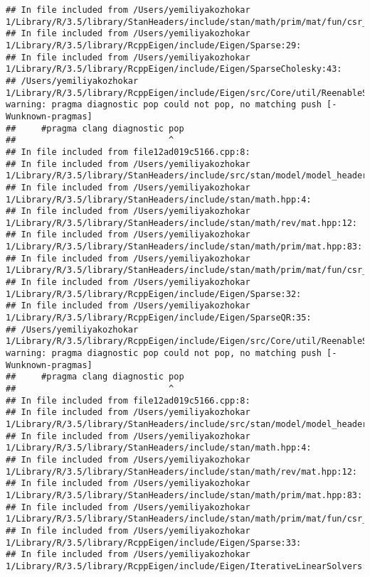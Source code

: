 \documentclass[]{article}
\begin{document}
\begin{verbatim}
## In file included from /Users/yemiliyakozhokar 1/Library/R/3.5/library/StanHeaders/include/stan/math/prim/mat/fun/csr_extract_u.hpp:6:
## In file included from /Users/yemiliyakozhokar 1/Library/R/3.5/library/RcppEigen/include/Eigen/Sparse:29:
## In file included from /Users/yemiliyakozhokar 1/Library/R/3.5/library/RcppEigen/include/Eigen/SparseCholesky:43:
## /Users/yemiliyakozhokar 1/Library/R/3.5/library/RcppEigen/include/Eigen/src/Core/util/ReenableStupidWarnings.h:10:30: warning: pragma diagnostic pop could not pop, no matching push [-Wunknown-pragmas]
##     #pragma clang diagnostic pop
##                              ^
## In file included from file12ad019c5166.cpp:8:
## In file included from /Users/yemiliyakozhokar 1/Library/R/3.5/library/StanHeaders/include/src/stan/model/model_header.hpp:4:
## In file included from /Users/yemiliyakozhokar 1/Library/R/3.5/library/StanHeaders/include/stan/math.hpp:4:
## In file included from /Users/yemiliyakozhokar 1/Library/R/3.5/library/StanHeaders/include/stan/math/rev/mat.hpp:12:
## In file included from /Users/yemiliyakozhokar 1/Library/R/3.5/library/StanHeaders/include/stan/math/prim/mat.hpp:83:
## In file included from /Users/yemiliyakozhokar 1/Library/R/3.5/library/StanHeaders/include/stan/math/prim/mat/fun/csr_extract_u.hpp:6:
## In file included from /Users/yemiliyakozhokar 1/Library/R/3.5/library/RcppEigen/include/Eigen/Sparse:32:
## In file included from /Users/yemiliyakozhokar 1/Library/R/3.5/library/RcppEigen/include/Eigen/SparseQR:35:
## /Users/yemiliyakozhokar 1/Library/R/3.5/library/RcppEigen/include/Eigen/src/Core/util/ReenableStupidWarnings.h:10:30: warning: pragma diagnostic pop could not pop, no matching push [-Wunknown-pragmas]
##     #pragma clang diagnostic pop
##                              ^
## In file included from file12ad019c5166.cpp:8:
## In file included from /Users/yemiliyakozhokar 1/Library/R/3.5/library/StanHeaders/include/src/stan/model/model_header.hpp:4:
## In file included from /Users/yemiliyakozhokar 1/Library/R/3.5/library/StanHeaders/include/stan/math.hpp:4:
## In file included from /Users/yemiliyakozhokar 1/Library/R/3.5/library/StanHeaders/include/stan/math/rev/mat.hpp:12:
## In file included from /Users/yemiliyakozhokar 1/Library/R/3.5/library/StanHeaders/include/stan/math/prim/mat.hpp:83:
## In file included from /Users/yemiliyakozhokar 1/Library/R/3.5/library/StanHeaders/include/stan/math/prim/mat/fun/csr_extract_u.hpp:6:
## In file included from /Users/yemiliyakozhokar 1/Library/R/3.5/library/RcppEigen/include/Eigen/Sparse:33:
## In file included from /Users/yemiliyakozhokar 1/Library/R/3.5/library/RcppEigen/include/Eigen/IterativeLinearSolvers:46:

\end{verbatim}
\end{document}
